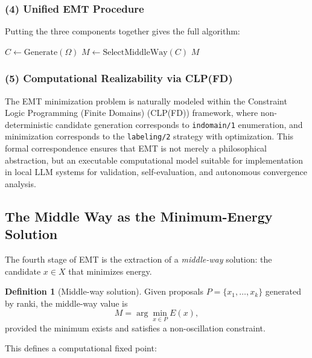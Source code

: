 \documentclass[11pt]{article}
\theoremstyle{definition}
\newtheorem{definition}[theorem]{Definition}
\theoremstyle{remark}
\begin{document}
\subsubsection*{(4) Unified EMT Procedure}

Putting the three components together gives the full algorithm:

\begin{algorithmic}[1]
    \State $C \gets \mathrm{Generate}(\Omega)$
    \State $M \gets \mathrm{SelectMiddleWay}(C)$
    \State \Return $M$
\EndProcedure
\end{algorithmic}

\subsubsection*{(5) Computational Realizability via CLP(FD)}

The EMT minimization problem is naturally modeled within the
Constraint Logic Programming (Finite Domains) (CLP(FD)) framework,
where non-deterministic candidate generation corresponds to
\texttt{indomain/1} enumeration, and minimization corresponds to
the \texttt{labeling/2} strategy with optimization.
This formal correspondence ensures that EMT is not merely a
philosophical abstraction, but an executable computational model
suitable for implementation in local LLM systems for validation,
self-evaluation, and autonomous convergence analysis.


\subsection{The Middle Way as the Minimum-Energy Solution}

The fourth stage of EMT is the extraction of a \emph{middle-way}
solution: the candidate $x \in X$ that minimizes energy.

\begin{definition}[Middle-way solution]
Given proposals $P=\{x_1,\dots,x_k\}$ generated by ranki, the
middle-way value is
\[
   M = \arg\min_{x \in P} E(x),
\]
provided the minimum exists and satisfies a non-oscillation
constraint.
\end{definition}

This defines a computational fixed point:
\end{document}
